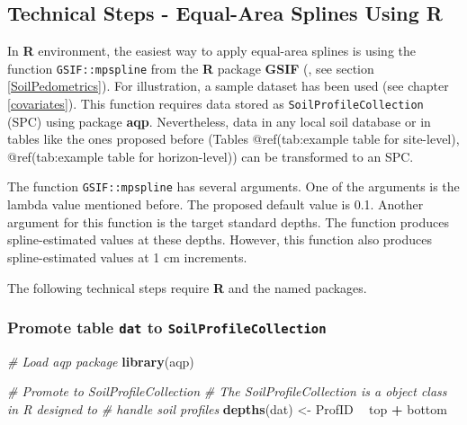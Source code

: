 \documentclass[10pt,b5paper,]{book}
\newenvironment{Shaded}{\begin{snugshade}}{\end{snugshade}}
\newcommand{\CommentTok}[1]{\textcolor[rgb]{0.56,0.35,0.01}{\textit{#1}}}
\newcommand{\KeywordTok}[1]{\textcolor[rgb]{0.13,0.29,0.53}{\textbf{#1}}}
\newcommand{\NormalTok}[1]{#1}
\newcommand{\OperatorTok}[1]{\textcolor[rgb]{0.81,0.36,0.00}{\textbf{#1}}}
\newcommand{\StringTok}[1]{\textcolor[rgb]{0.31,0.60,0.02}{#1}}
\theoremstyle{definition}
\theoremstyle{definition}
\theoremstyle{definition}
\theoremstyle{remark}
\begin{document}
\hypertarget{EqualAreaSplines}{%
\subsection{Technical Steps - Equal-Area Splines Using
R}\label{EqualAreaSplines}}

In \textbf{R} environment, the easiest way to apply equal-area splines
is using the function \texttt{GSIF::mpspline} from the \textbf{R}
package \textbf{GSIF} (\cite{hengl_2016_gsif}, see section
\ref{SoilPedometrics}). For illustration, a sample dataset has been used
(see chapter \ref{covariates}). This function requires data stored as
\texttt{SoilProfileCollection} (SPC) using package \textbf{aqp}.
Nevertheless, data in any local soil database or in tables like the ones
proposed before (Tables @ref(tab:example table for site-level),
@ref(tab:example table for horizon-level)) can be transformed to an SPC.

The function \texttt{GSIF::mpspline} has several arguments. One of the
arguments is the lambda value mentioned before. The proposed default
value is 0.1. Another argument for this function is the target standard
depths. The function produces spline-estimated values at these depths.
However, this function also produces spline-estimated values at 1 cm
increments.

The following technical steps require \textbf{R} and the named packages.

\hypertarget{promote-table-dat-to-soilprofilecollection}{%
\subsubsection{\texorpdfstring{Promote table \texttt{dat} to
\texttt{SoilProfileCollection}}{Promote table dat to SoilProfileCollection}}\label{promote-table-dat-to-soilprofilecollection}}

\begin{Shaded}
\begin{Highlighting}[]
\CommentTok{# Load aqp package}
\KeywordTok{library}\NormalTok{(aqp)}

\CommentTok{# Promote to SoilProfileCollection }
\CommentTok{# The SoilProfileCollection is a object class in R designed to }
\CommentTok{# handle soil profiles}
\KeywordTok{depths}\NormalTok{(dat) <-}\StringTok{ }\NormalTok{ProfID }\OperatorTok{~}\StringTok{ }\NormalTok{top }\OperatorTok{+}\StringTok{ }\NormalTok{bottom}
\end{Highlighting}
\end{Shaded}
\end{document}

